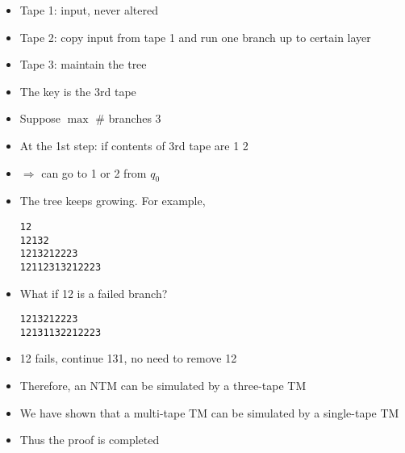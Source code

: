 \begin{frame}
\begin{itemize}
\begin{center}
\end{center}
  
\item 
Tape 1: input, never altered

\item
  Tape 2: copy input from tape 1 and run one branch up to certain layer
  
\item
  Tape 3: maintain the tree

\item
  The key is the 3rd tape

\item
  Suppose $\max$ \# branches 3

\item
  [] At the 1st step: if contents of 3rd tape are 1 2 
\item
  [] $\Rightarrow $ can go to
1 or 2 from $q_0$

\item The tree keeps growing. For example, 
\begin{alltt}
1 2
12 13 2
12 13 21 22 23
121 123 13 21 22 23
\end{alltt}
\item What if 12 is a failed branch?
\begin{alltt}
\alert{12} 13 21 22 23
\alert{12} 131 132 21 22 23
\end{alltt}
\item
  12 fails, continue 131, no need to remove 12
\item Therefore, an NTM can be simulated by a three-tape TM
\item
  We have shown that a multi-tape TM can be simulated
  by a single-tape TM
\item
  Thus the proof is completed
\end{itemize}\end{frame}


